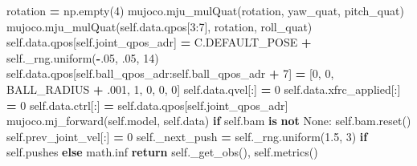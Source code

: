 \documentclass[
  chinese,
  11pt,
  letterpaper,
]{article}
\newenvironment{Shaded}{\begin{snugshade}}{\end{snugshade}}
\newcommand{\ControlFlowTok}[1]{\textcolor[rgb]{0.13,0.29,0.53}{\textbf{#1}}}
\newcommand{\DecValTok}[1]{\textcolor[rgb]{0.00,0.00,0.81}{#1}}
\newcommand{\FloatTok}[1]{\textcolor[rgb]{0.00,0.00,0.81}{#1}}
\newcommand{\KeywordTok}[1]{\textcolor[rgb]{0.13,0.29,0.53}{\textbf{#1}}}
\newcommand{\NormalTok}[1]{#1}
\newcommand{\OperatorTok}[1]{\textcolor[rgb]{0.81,0.36,0.00}{\textbf{#1}}}
\newcommand{\VariableTok}[1]{\textcolor[rgb]{0.00,0.00,0.00}{#1}}
\renewenvironment{Shaded}{\par\smallskip}{\par\smallskip}
\begin{document}
\begin{Shaded}
\begin{Highlighting}[]
\NormalTok{        rotation }\OperatorTok{=}\NormalTok{ np.empty(}\DecValTok{4}\NormalTok{)}
\NormalTok{        mujoco.mju\_mulQuat(rotation, yaw\_quat, pitch\_quat)}
\NormalTok{        mujoco.mju\_mulQuat(}\VariableTok{self}\NormalTok{.data.qpos[}\DecValTok{3}\NormalTok{:}\DecValTok{7}\NormalTok{], rotation, roll\_quat)}
        \VariableTok{self}\NormalTok{.data.qpos[}\VariableTok{self}\NormalTok{.joint\_qpos\_adr] }\OperatorTok{=}\NormalTok{ C.DEFAULT\_POSE }\OperatorTok{+} \VariableTok{self}\NormalTok{.\_rng.uniform(}\OperatorTok{{-}}\FloatTok{.05}\NormalTok{, }\FloatTok{.05}\NormalTok{, }\DecValTok{14}\NormalTok{)}
        \VariableTok{self}\NormalTok{.data.qpos[}\VariableTok{self}\NormalTok{.ball\_qpos\_adr:}\VariableTok{self}\NormalTok{.ball\_qpos\_adr }\OperatorTok{+} \DecValTok{7}\NormalTok{] }\OperatorTok{=}\NormalTok{ [}\DecValTok{0}\NormalTok{, }\DecValTok{0}\NormalTok{, BALL\_RADIUS }\OperatorTok{+} \FloatTok{.001}\NormalTok{, }\DecValTok{1}\NormalTok{, }\DecValTok{0}\NormalTok{, }\DecValTok{0}\NormalTok{, }\DecValTok{0}\NormalTok{]}
        \VariableTok{self}\NormalTok{.data.qvel[:] }\OperatorTok{=} \DecValTok{0}
        \VariableTok{self}\NormalTok{.data.xfrc\_applied[:] }\OperatorTok{=} \DecValTok{0}
        \VariableTok{self}\NormalTok{.data.ctrl[:] }\OperatorTok{=} \VariableTok{self}\NormalTok{.data.qpos[}\VariableTok{self}\NormalTok{.joint\_qpos\_adr]}
\NormalTok{        mujoco.mj\_forward(}\VariableTok{self}\NormalTok{.model, }\VariableTok{self}\NormalTok{.data)}
        \ControlFlowTok{if} \VariableTok{self}\NormalTok{.bam }\KeywordTok{is} \KeywordTok{not} \VariableTok{None}\NormalTok{:}
            \VariableTok{self}\NormalTok{.bam.reset()}
        \VariableTok{self}\NormalTok{.prev\_joint\_vel[:] }\OperatorTok{=} \DecValTok{0}
        \VariableTok{self}\NormalTok{.\_next\_push }\OperatorTok{=} \VariableTok{self}\NormalTok{.\_rng.uniform(}\FloatTok{1.5}\NormalTok{, }\DecValTok{3}\NormalTok{) }\ControlFlowTok{if} \VariableTok{self}\NormalTok{.pushes }\ControlFlowTok{else}\NormalTok{ math.inf}
        \ControlFlowTok{return} \VariableTok{self}\NormalTok{.\_get\_obs(), }\VariableTok{self}\NormalTok{.metrics()}


\end{Highlighting}
\end{Shaded}
\end{document}
